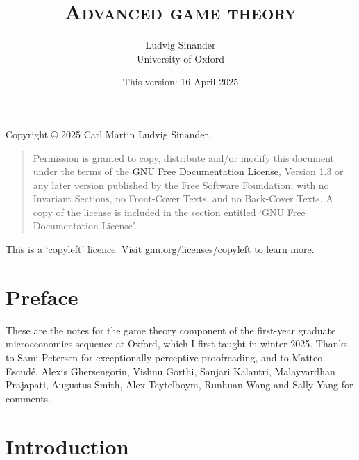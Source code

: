 \documentclass[11pt,letterpaper,reqno,oneside]{book}
\title{\scshape Advanced game theory}
\author{Ludvig Sinander \\
University of Oxford}
\date{\small This version: 16 April 2025}
\begin{document}
\maketitle

\pagebreak
\hspace{1pt}\vfill
\noindent
Copyright \copyright{} 2025 Carl Martin Ludvig Sinander.

\begin{quotation}
\noindent
Permission is granted to copy, distribute and/or modify this document under the terms of the \href{https://www.gnu.org/licenses/fdl}{GNU Free Documentation License}, Version 1.3 or any later version published by the Free Software Foundation; with no Invariant Sections, no Front-Cover Texts, and no Back-Cover Texts. A copy of the license is included in the section entitled `GNU
Free Documentation License'.
\end{quotation}

\noindent
This is a `copyleft' licence.
Visit \href{https://www.gnu.org/licenses/copyleft}{gnu.org/licenses/copyleft} to learn more.



\chapter*{Preface}
\label{preface}

These are the notes for the game theory component of the first-year graduate microeconomics sequence at Oxford, which I first taught in winter 2025.
Thanks to Sami Petersen for exceptionally perceptive proofreading, and to Matteo Escudé, Alexis Ghersengorin, Vishnu Gorthi, Sanjari Kalantri, Malayvardhan Prajapati, Augustus Smith, Alex Teytelboym, Runhuan Wang and Sally Yang for comments.



\pagebreak
{}
\setcounter{tocdepth}{1}
\tableofcontents
{}



\setcounter{chapter}{-1}
\chapter{Introduction}
\label{ch0}
\end{document}
